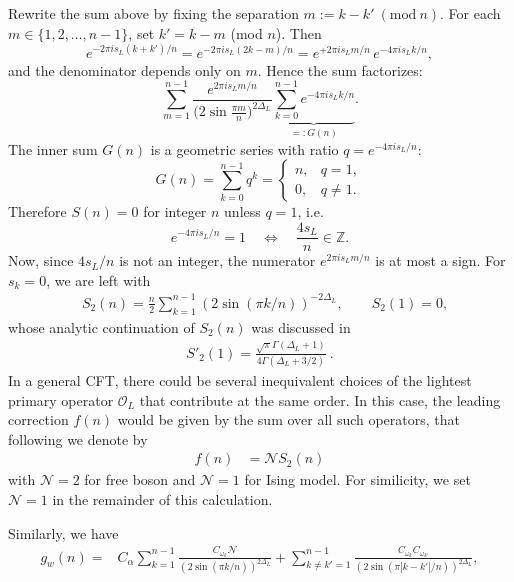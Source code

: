 \documentclass[11pt]{article}
\newcommand{\mO}{\mathcal{O}}
\newcommand{\nn}{\nonumber}
\begin{document}
  Rewrite the sum above by fixing the separation $m:=k-k' \ (\mathrm{mod}\ n)$. For
  each $m\in\{1,2,\dots,n-1\}$, set $k'=k-m$ (mod $n$). Then
  \[
    e^{-2\pi i s_L (k+k')/n}= e^{-2\pi i s_L (2k-m)/n}= e^{+2\pi i s_L m/n}\,e^{-4\pi
    i s_L k/n},
  \]
  and the denominator depends only on $m$. Hence the sum factorizes:
  \begin{equation}
    \sum_{m=1}^{n-1}\frac{e^{2\pi i s_L m/n}}{\bigl(2\sin\frac{\pi m}{n}\bigr)^{2\Delta_L}}
    \underbrace{\sum_{k=0}^{n-1} e^{-4\pi i s_L k/n}}_{=:G(n)}.
  \end{equation}
  The inner sum $G(n)$ is a geometric series with ratio $q=e^{-4\pi i s_L/n}$:
  \[
    G(n)=\sum_{k=0}^{n-1}q^{k}=
    \begin{cases}
      n, & q=1,     \\
      0, & q\neq 1.
    \end{cases}
  \]
  Therefore $S(n)=0$ for integer $n$ unless $q=1$, i.e.
  \[
    e^{-4\pi i s_L/n}=1 \quad\Longleftrightarrow\quad \frac{4s_{L}}{n}\in\mathbb{Z}
    .
  \]
  Now, since $4s_{L}/n$ is not an integer, the numerator $e^{2\pi i s_L m/n}$ is
  at most a sign. For $s_{k}=0$, we are left with
  \begin{align}
     & S_{2}(n)=\frac{n}{2}\sum_{k=1}^{n-1}(2\sin(\pi k/n))^{-2\Delta_L},\qquad S_{2}(1)=0,
  \end{align}
  whose analytic continuation of $S_{2}(n)$ was discussed in
  \cite{calabrese2010entanglement}
  \begin{align}
    S'_{2}(1)=\frac{\sqrt{\pi}\Gamma(\Delta_{L}+1)}{4\Gamma(\Delta_{L}+3/2)}\ .
  \end{align}
  In a general CFT, there could be several inequivalent choices of the lightest primary
  operator $\mO_{L}$ that contribute at the same order. In this case, the leading
  correction $f(n)$ would be given by the sum over all such operators, that
  following \cite{calabrese2010entanglement} we denote by
  \begin{align}
    f(n) & =\mathcal{N}S_{2}(n)
  \end{align}
  with $\mathcal{N}=2$ for free boson and $\mathcal{N}=1$ for Ising model. For similicity,
  we set $\mathcal{N}=1$ in the remainder of this calculation.

  Similarly, we have
  \begin{align}
    g_{w}(n)= & C_{\alpha}\sum_{k=1}^{n-1}\frac{C_{\omega_k}\mathcal{N}}{(2\sin(\pi k/n))^{2\Delta_L}}+\sum_{k\neq k'=1}^{n-1}\frac{C_{\omega_k}C_{\omega_{k'}}}{(2\sin(\pi |k-k'|/n))^{2\Delta_L}}, %
  \end{align}
\end{document}
